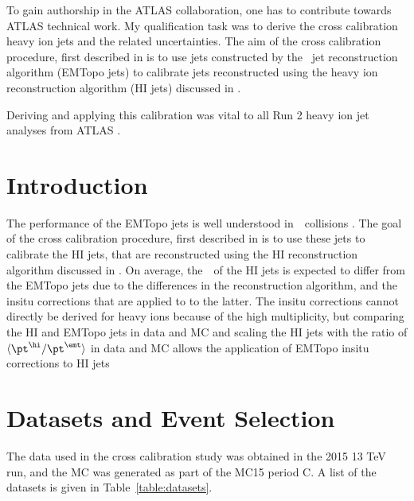 

To gain authorship in the ATLAS collaboration, one has to contribute towards ATLAS technical work. My qualification task was to derive the cross calibration heavy ion jets and the related uncertainties. The aim of the cross calibration procedure, first described in \cite{xcalib_run1} is to use jets constructed by the \pp\ jet reconstruction algorithm (EMTopo jets) \cite{Aad:2014bia, Aad:2011he, Aaboud:2017jcu} to calibrate jets reconstructed using the heavy ion reconstruction algorithm (HI jets) discussed in \cite{Aad:hi_jets}.

Deriving and applying this calibration was vital to all Run 2 heavy ion jet analyses from ATLAS \cite{PhysRevC.98.024908, 201865, 2019108, 2019108, 2019167}.


\section{Introduction}
\label{sec:qual_intro}

The performance of the EMTopo jets is well understood in\ \pp \ collisions \cite{Aad:2014bia} \cite{Aad:2011he}. The goal of the cross calibration procedure, first described in \cite{xcalib_run1} is to use these jets to calibrate the HI jets, that are reconstructed using the HI reconstruction algorithm discussed in \cite{Aad:hi_jets}. On average, the\ \pt \ of the HI jets is expected to differ from the EMTopo jets due to the differences in the reconstruction algorithm, and the insitu corrections that are applied to to the latter. The insitu corrections cannot directly be derived for heavy ions because of the high multiplicity, but comparing the HI and EMTopo jets in data and MC and scaling the HI jets with the ratio of $\langle \pt ^\hi / \pt^\emt \rangle$ in data and MC allows the application of EMTopo insitu corrections to HI jets \cite{xcalib_run1}

\section{Datasets and Event Selection}
\label{sec:qual_datasets}
The data used in the cross calibration study was obtained in the 2015 13 TeV run, and the MC was generated as part of the MC15 period C. A list of the datasets is given in Table~\ref{table:datasets}.



